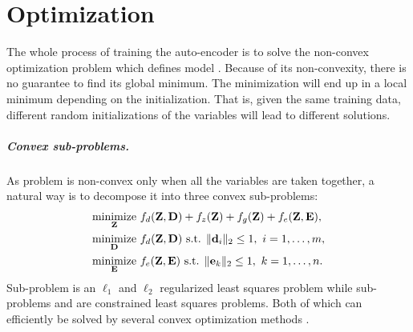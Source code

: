 

\chapter{Optimization} \label{chap:optimization}


The whole process of training the auto-encoder is to solve the non-convex optimization problem which defines model . Because of its non-convexity, there is no guarantee to find its global minimum.
The minimization will end up in a local minimum depending on the initialization. That is, given the same training data, different random initializations of the variables will lead to different solutions.

\paragraph{Convex sub-problems.}
As problem  is non-convex only when all the variables are taken together, a natural way is to decompose it into three convex sub-problems:
\begin{align}
	\label{eqn:minZ}
	\operatorname*{minimize}\limits_{\mathbf{Z}} \  & f_d(\mathbf{Z}, \mathbf{D}) + f_z(\mathbf{Z}) + f_g(\mathbf{Z}) + f_e(\mathbf{Z}, \mathbf{E}) , \\
	\label{eqn:minD}
	\operatorname*{minimize}\limits_{\mathbf{D}} \  & f_d(\mathbf{Z}, \mathbf{D}) \text{ s.t. } \|\mathbf{d}_i\|_2 \leq 1 ,\ i = 1, \ldots, m , \\
	\label{eqn:minE}
	\operatorname*{minimize}\limits_{\mathbf{E}} \  & f_e(\mathbf{Z}, \mathbf{E}) \text{ s.t. } \|\mathbf{e}_k\|_2 \leq 1 ,\ k = 1, \ldots, n.
\end{align}
Sub-problem  is an $\ell_1$ and $\ell_2$ regularized least squares problem while sub-problems  and  are constrained least squares problems. Both of which can efficiently be solved by several convex optimization methods \cite{combettes2011proximalSplitting, beck2009FISTA, chambolle2011PrimalDual}.


